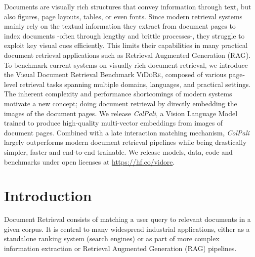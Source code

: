 \clearpage

\begin{kaobox}[frametitle=Paper Abstract]


Documents are visually rich structures that convey information through text, but also figures, page layouts, tables, or even fonts. Since modern retrieval systems mainly rely on the textual information they extract from document pages to index documents -often through lengthy and brittle processes-, they struggle to exploit key visual cues efficiently. This limits their capabilities in many practical document retrieval applications such as Retrieval Augmented Generation (RAG).
To benchmark current systems on visually rich document retrieval, we introduce the Visual Document Retrieval Benchmark \textsc{ViDoRe}, composed of various page-level retrieval tasks spanning multiple domains, languages, and practical settings. 
The inherent complexity and performance shortcomings of modern systems motivate a new concept; doing document retrieval by directly embedding the images of the document pages. We release \textit{ColPali}, a Vision Language Model trained to produce high-quality multi-vector embeddings from images of document pages. Combined with a late interaction matching mechanism, \textit{ColPali} largely outperforms modern document retrieval pipelines while being drastically simpler, faster and end-to-end trainable. 
We release models, data, code and benchmarks under open licenses at \url{https://hf.co/vidore}.


\end{kaobox}


\section{Introduction}

Document Retrieval consists of matching a user query to relevant documents in a given corpus. It is central to many widespread industrial applications, either as a standalone ranking system (search engines) or as part of more complex information extraction or Retrieval Augmented Generation (RAG) pipelines.



